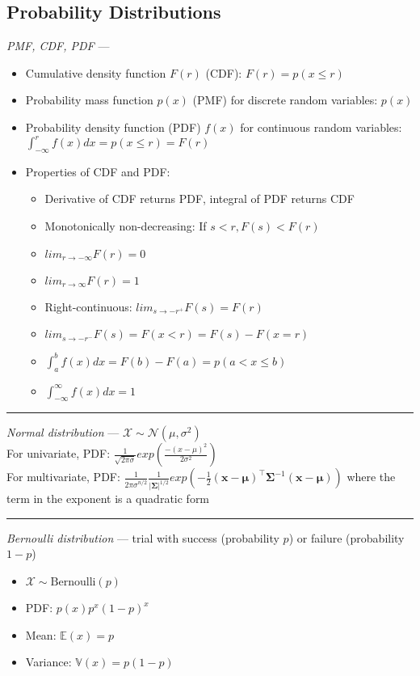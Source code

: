 \subsection*{Probability Distributions}
\emph{PMF, CDF, PDF} --- 
\begin{itemize}
    \item Cumulative density function $F(r)$ (CDF): $F(r) = p(x \leq r)$
    \item Probability mass function $p(x)$ (PMF) for discrete random variables: $p(x)$
    \item Probability density function (PDF) $f(x)$ for continuous random variables: $\int_{-\infty}^r f(x)dx = p(x \leq r) = F(r)$
    \item Properties of CDF and PDF:
    \begin{itemize}
        \item Derivative of CDF returns PDF, integral of PDF returns CDF
        \item Monotonically non-decreasing: If $s<r, F(s) < F(r)$
        \item $lim_{r\rightarrow-\infty} F(r) = 0$
        \item $lim_{r\rightarrow\infty} F(r) = 1$
        \item Right-continuous: $lim_{s\rightarrow-r^+} F(s) = F(r)$
        \item $lim_{s\rightarrow-r^-} F(s) = F(x < r) = F(s) - F(x = r)$
        \item $\int_a^b f(x)dx = F(b)-F(a) = p(a < x \leq b)$
        \item $\int_{-\infty}^\infty f(x)dx = 1$
    \end{itemize}
\end{itemize}

{\color{lightgray}\hrule height 0.001mm}

\emph{Normal distribution} --- 
$\mathcal{X} \sim \mathcal{N}(\mu, \sigma^2)$\\
For univariate, PDF: $\frac{1}{\sqrt{2\pi\sigma}} exp(\frac{-(x-\mu)^2}{2\sigma^2})$\\
For multivariate, PDF: $\frac{1}{{2\pi\sigma}^{n/2}} \frac{1}{|\boldsymbol{\Sigma}|^{1/2}} exp(-\frac{1}{2} (\boldsymbol{x}-\boldsymbol{\mu})^\intercal \boldsymbol{\Sigma}^{-1} (\boldsymbol{x}-\boldsymbol{\mu}))$ where the term in the exponent is a quadratic form

{\color{lightgray}\hrule height 0.001mm}

\emph{Bernoulli distribution} --- trial with success (probability $p$) or failure (probability $1-p$)
\begin{multicols}{2}
\begin{itemize}
    \item $\mathcal{X} \sim \textrm{Bernoulli}(p)$
    \item PDF: $p(x) p^x (1-p)^x$
    \item Mean: $\mathbb{E}(x) = p$
    \item Variance: $\mathbb{V}(x) = p(1-p)$
\end{itemize}
\end{multicols}

